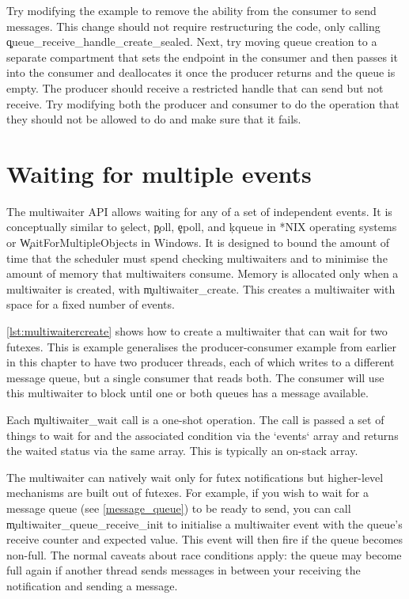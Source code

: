 Try modifying the example to remove the ability from the consumer to send messages.
This change should not require restructuring the code, only calling \c{queue_receive_handle_create_sealed}.
Next, try moving queue creation to a separate compartment that sets the endpoint in the consumer and then passes it into the consumer and deallocates it once the producer returns and the queue is empty.
The producer should receive a restricted handle that can send but not receive.
Try modifying both the producer and consumer to do the operation that they should not be allowed to do and make sure that it fails.

\section[label=multiwaiter]{Waiting for multiple events}

The multiwaiter API allows waiting for any of a set of independent events.
It is conceptually similar to \c{select}, \c{poll}, \c{epoll}, and \c{kqueue} in *NIX operating systems or \c{WaitForMultipleObjects} in Windows.
It is designed to bound the amount of time that the scheduler must spend checking multiwaiters and to minimise the amount of memory that multiwaiters consume.
Memory is allocated only when a multiwaiter is created, with \c{multiwaiter_create}.
This creates a multiwaiter with space for a fixed number of events.


\ref{lst:multiwaitercreate} shows how to create a multiwaiter that can wait for two futexes.
This is example generalises the producer-consumer example from earlier in this chapter to have two producer threads, each of which writes to a different message queue, but a single consumer that reads both.
The consumer will use this multiwaiter to block until one or both queues has a message available.

\codelisting[filename=examples/multiwaiter/queue.cc,marker=multiwaiter_create,label=lst:multiwaitercreate,caption="Creating a multiwaiter object."]{}

Each \c{multiwaiter_wait} call is a one-shot operation.
The call is passed a set of things to wait for and the associated condition via the `events` array and returns the waited status via the same array.
This is typically an on-stack array.


The multiwaiter can natively wait only for futex notifications but higher-level mechanisms are built out of futexes.
For example, if you wish to wait for a message queue (see \ref{message_queue}) to be ready to send, you can call \c{multiwaiter_queue_receive_init} to initialise a multiwaiter event with the queue's receive counter and expected value.
This event will then fire if the queue becomes non-full.
The normal caveats about race conditions apply: the queue may become full again if another thread sends messages in between your receiving the notification and sending a message.


